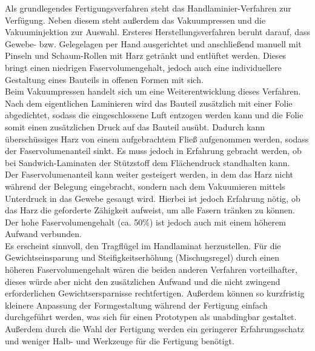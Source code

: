 \noindent Als grundlegendes Fertigungsverfahren steht das Handlaminier-Verfahren zur Verfügung. Neben diesem steht außerdem das Vakuumpressen und die Vakuuminjektion zur Auswahl. Ersteres Herstellungsverfahren beruht darauf, dass Gewebe- bzw. Gelegelagen per Hand ausgerichtet und anschließend manuell mit Pinseln und Schaum-Rollen mit Harz getränkt und entlüftet werden. Dieses bringt einen niedrigen Faservolumengehalt, jedoch auch eine individuellere Gestaltung eines Bauteils in offenen Formen mit sich. \\
Beim Vakuumpressen handelt sich um eine Weiterentwicklung dieses Verfahren. Nach dem eigentlichen Laminieren wird das Bauteil zusätzlich mit einer Folie abgedichtet, sodass die eingeschlossene Luft entzogen werden kann und die Folie somit einen zusätzlichen Druck auf das Bauteil ausübt. Dadurch kann überschüssiges Harz von einem aufgebrachtem Fließ aufgenommen werden, sodass der Faservolumenanteil sinkt. Es muss jedoch in Erfahrung gebracht werden, ob bei Sandwich-Laminaten der Stützstoff dem Flächendruck standhalten kann.\\
Der Faservolumenanteil kann weiter gesteigert werden, in dem das Harz nicht während der Belegung eingebracht, sondern nach dem Vakuumieren mittels Unterdruck in das Gewebe gesaugt wird. Hierbei ist jedoch Erfahrung nötig, ob das Harz die geforderte Zähigkeit aufweist, um alle Fasern tränken zu können. Der hohe Faservolumengehalt (ca. 50\%) ist jedoch auch mit einem höherem Aufwand verbunden.\\

\noindent Es erscheint sinnvoll, den Tragflügel im Handlaminat herzustellen. Für die Gewichtseinsparung und Steifigkeitserhöhung (Mischugsregel) durch einen höheren Faservolumengehalt wären die beiden anderen Verfahren vorteilhafter, dieses würde aber nicht den zusätzlichen Aufwand und die nicht zwingend erforderlichen Gewichtsersparnisse rechtfertigen. Außerdem können so kurzfristig kleinere Anpassung der Formgestaltung während der Fertigung einfach durchgeführt werden, was sich für einen Prototypen als unabdingbar gestaltet. Außerdem durch die Wahl der Fertigung werden ein geringerer Erfahrungsschatz und weniger Halb- und Werkzeuge für die Fertigung benötigt.